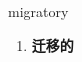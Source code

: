 
\begin{frame}
{\huge migratory}
\begin{center}
\begin{enumerate}\Large
  \item \textbf{迁移的}
\end{enumerate}
\end{center}
\end{frame}
